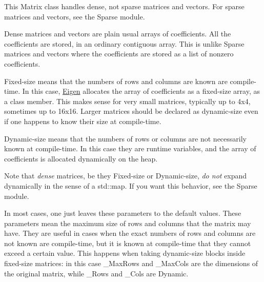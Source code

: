 \begin{DoxyDescription}
\item[{\bfseries \label{class_matrix_dense}%
\hypertarget{class_matrix_dense}{}%
Dense versus sparse\-:} ]This Matrix class handles dense, not sparse matrices and vectors. For sparse matrices and vectors, see the Sparse module.

Dense matrices and vectors are plain usual arrays of coefficients. All the coefficients are stored, in an ordinary contiguous array. This is unlike Sparse matrices and vectors where the coefficients are stored as a list of nonzero coefficients.


\item[{\bfseries \label{class_matrix_fixedsize}%
\hypertarget{class_matrix_fixedsize}{}%
Fixed-\/size versus dynamic-\/size\-:} ]Fixed-\/size means that the numbers of rows and columns are known are compile-\/time. In this case, \hyperlink{namespace_eigen}{Eigen} allocates the array of coefficients as a fixed-\/size array, as a class member. This makes sense for very small matrices, typically up to 4x4, sometimes up to 16x16. Larger matrices should be declared as dynamic-\/size even if one happens to know their size at compile-\/time.

Dynamic-\/size means that the numbers of rows or columns are not necessarily known at compile-\/time. In this case they are runtime variables, and the array of coefficients is allocated dynamically on the heap.

Note that {\itshape dense} matrices, be they Fixed-\/size or Dynamic-\/size, {\itshape do not} expand dynamically in the sense of a std\-::map. If you want this behavior, see the Sparse module.


\item[{\bfseries \label{class_matrix_maxrows}%
\hypertarget{class_matrix_maxrows}{}%
\-\_\-\-Max\-Rows and \-\_\-\-Max\-Cols\-:} ]In most cases, one just leaves these parameters to the default values. These parameters mean the maximum size of rows and columns that the matrix may have. They are useful in cases when the exact numbers of rows and columns are not known are compile-\/time, but it is known at compile-\/time that they cannot exceed a certain value. This happens when taking dynamic-\/size blocks inside fixed-\/size matrices\-: in this case \-\_\-\-Max\-Rows and \-\_\-\-Max\-Cols are the dimensions of the original matrix, while \-\_\-\-Rows and \-\_\-\-Cols are Dynamic. 
\end{DoxyDescription}

